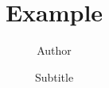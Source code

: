 \documentclass[t]{beamer}
\title[Ex] %
{Example}
\author{Author \inst{1}}
\institute[] %
{  
\inst{1} Institution\\
}
\date{Subtitle}
\begin{document}
\begin{frame}
  \titlepage
\end{frame}


\end{document}
